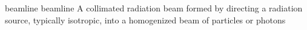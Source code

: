 \newglsXterm%
{beamline}%
{beamline}%
{A collimated radiation beam formed by directing a radiation source, typically isotropic, into a homogenized beam of particles or photons}%